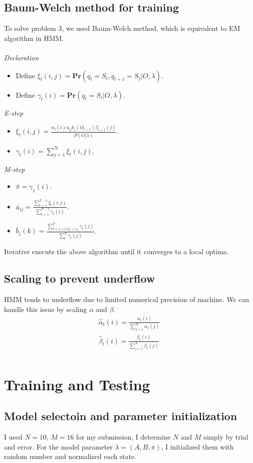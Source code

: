 \documentclass[english]{article}
\begin{document}
\subsection {Baum-Welch method for training}
To solve problem 3, we used Baum-Welch method, which is equivalent to EM algorithm in HMM. \\\\
\emph{Declaration}
\begin{itemize}
\item Define $\xi_t(i,j) = \mathbf{Pr}(q_t = S_i, q_{t+1} = S_j| O, \lambda)$.
\item Define $\gamma_t(i) = \mathbf{Pr}(q_t = S_i| O, \lambda)$.
\end{itemize}
\emph{E-step}
\begin{itemize}
\item $\xi_t(i,j) = \frac{\alpha_t(i)a_{ij}b_j(O_{t+1})\beta_{t+1}(j)}{P(O|\lambda)}$.
\item $\gamma_t(i) = \sum_{j=1}^N \xi_t(i,j)$.
\end{itemize}
\emph{M-step}
\begin{itemize}
\item $\bar\pi = \gamma_1(i)$.
\item $\bar a_{ij} = \frac{\sum_{t=1}^{T-1} \xi_t(i,j)}{\sum_{t=1}^{T-1}\gamma_t(i)}$.
\item $\bar b_j(k) = \frac{\sum_{t=1, s.t. O_t = v_k}^T \gamma_t(j)}{\sum_t^T \gamma_t(j)}$.
\end{itemize}
Iterative execute the above algorithm until it converges to a local optima. 
\subsection {Scaling to prevent underflow}
HMM tends to underflow due to limited numerical precision of machine. We can handle this issue by scaling $\alpha$ and $\beta$. \\
\begin{align*}
\hat \alpha_t(i) = \frac{\alpha_t(i)}{\sum_{j=1}^N \alpha_t(j)}\\
\hat \beta_t(i) = \frac{\beta_t(i)}{\sum_{j=1}^N \beta_t(j)} \\
\end{align*}

\section {Training and Testing}
\subsection {Model selectoin and parameter initialization}
I used $N = 10$, $M =16$ for my submission, I determine $N$ and $M$ simply by trial and error. For the model parameter $\lambda = (A,B,\pi)$, I initialized them with random number and normalized each state. \\
\end{document}
